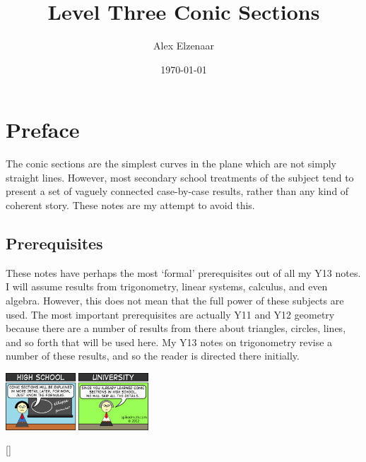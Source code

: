 \documentclass[a4paper,leqno]{article}
\title{Level Three Conic Sections}
\author{Alex Elzenaar}
\date{\today}
\numberwithin{equation}{section}
\theoremstyle{definition}
\theoremstyle{remark}
\begin{document}
\maketitle
\tableofcontents
\section*{Preface}
The conic sections are the simplest curves in the plane which are not simply straight lines. However, most secondary school treatments of the subject
tend to present a set of vaguely connected case-by-case results, rather than any kind of coherent story. These notes are my attempt to avoid this.

\subsection*{Prerequisites}
These notes have perhaps the most `formal' prerequisites out of all my Y13 notes. I will assume results from trigonometry, linear systems, calculus, and
even algebra. However, this does not mean that the full power of these subjects are used. The most important prerequisites are actually Y11 and Y12
geometry because there are a number of results from there about triangles, circles, lines, and so forth that will be used here. My Y13 notes on trigonometry
revise a number of these results, and so the reader is directed there initially.

\begin{center}
  \includegraphics[width=0.4\textwidth]{conics}
\end{center}

[{\titlerule[0.8pt]}]
\let\oldsection\section
\renewcommand\section{\clearpage\oldsection}
\end{document}
